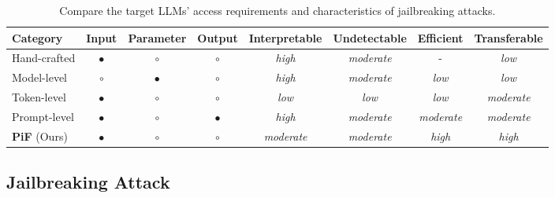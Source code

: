 \begin{table*}[t]
\setlength{\tabcolsep}{5.0pt} %
\fontsize{9.45}{10.0}\selectfont
\caption{Compare the target LLMs' access requirements and characteristics of jailbreaking attacks.}
\vspace{-0.6em}
\label{table:1}
\centering
\begin{tabular}{l | c c c | c c c c}
\toprule
\toprule
Category & Input & Parameter & Output & Interpretable & Undetectable & Efficient & Transferable \\
\midrule
Hand-crafted  & $\bullet$  & $\circ$ & $\circ$ & \cellcolor{RefColor!30}\textit{high} & \cellcolor{RefColor!20}\textit{moderate} & - & \cellcolor{RefColor!10}\textit{low} \\
Model-level & $\circ$ &  $\bullet$ & $\circ$ & \cellcolor{RefColor!30}\textit{high} &  \cellcolor{RefColor!20}\textit{moderate} & \cellcolor{RefColor!10}\textit{low} &  \cellcolor{RefColor!10}\textit{low} \\
Token-level & $\bullet$ & $\circ$ & $\circ$ & \cellcolor{RefColor!10}\textit{low} & \cellcolor{RefColor!10}\textit{low} & \cellcolor{RefColor!10}\textit{low} & \cellcolor{RefColor!20}\textit{moderate} \\
Prompt-level& $\bullet$ & $\circ$ & $\bullet$ & \cellcolor{RefColor!30}\textit{high} &  \cellcolor{RefColor!20}\textit{moderate} & \cellcolor{RefColor!20}\textit{moderate} & \cellcolor{RefColor!20}\textit{moderate} \\
\textbf{PiF} (Ours)& $\bullet$ & $\circ$ & $\circ$ & \cellcolor{RefColor!20}\textit{moderate} & \cellcolor{RefColor!20}\textit{moderate} & \cellcolor{RefColor!30}\textit{high} & \cellcolor{RefColor!30}\textit{high} \\
\bottomrule
\bottomrule
\end{tabular}
\vspace{-0.8em}
\end{table*}

\subsection{Jailbreaking Attack}
\label{section:2_2}

